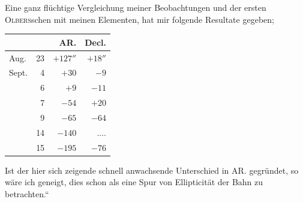 \par\indent Eine ganz flüchtige Vergleichung meiner Beobachtungen und der ersten \textsc{Olbers}schen mit meinen Elementen, hat mir folgende Resultate gegeben;
\begin{center}\fontsize{10}{12}\selectfont\setlength{\tabcolsep}{7pt}\renewcommand{\arraystretch}{1.15}\begin{tabular}{lr|r|r}
 & & AR. & Decl.\\\hline
Aug. & 23 & $+127''$ & $+18''$\\
Sept. & 4 & $+30$ & $-9$\\
 & 6 & $+9$ & $-11$\\
 & 7 & $-54$ & $+20$\\
 & 9 & $-65$ & $-64$\\
 & 14 & $-140$ & .\;.\;.\;.\\
 & 15 & $-195$ & $-76$\\
\end{tabular}\end{center}

\par\indent Ist der hier sich zeigende schnell anwachsende Unterschied in AR. gegründet, so wäre ich geneigt, dies schon als eine Spur von Ellipticität der Bahn zu betrachten.“
